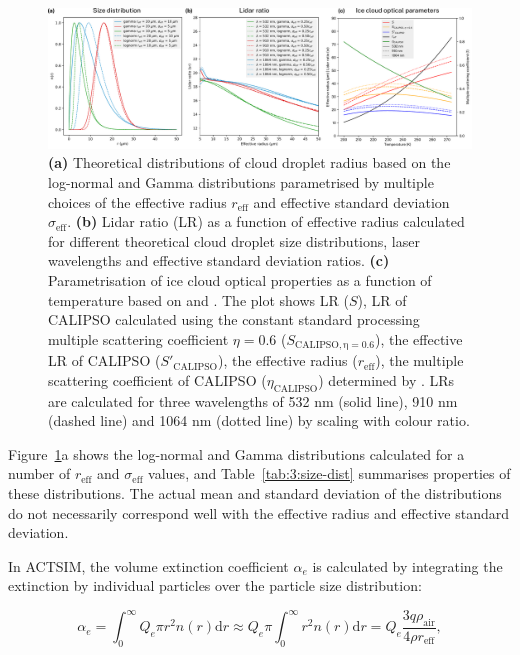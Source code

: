 \begin{figure}[t]
\centerline{\includegraphics[width=1.12\textwidth]{chapter3/fig/size_dist_rev2.pdf}}
\caption[Theoretical distributions of cloud droplet radius and parametrisation of ice]{
\textbf{(a)} Theoretical distributions of cloud droplet radius based on
the log-normal and Gamma distributions parametrised
by multiple choices of the effective radius $r_\text{eff}$ and effective standard deviation
$\sigma_\text{eff}$. \textbf{(b)} Lidar ratio (LR) as a function of effective
radius calculated for different theoretical cloud droplet size
distributions, laser wavelengths and effective standard deviation ratios.
\textbf{(c)}
Parametrisation of ice cloud optical properties as a function of temperature
based on \cite{garnier2015} and \cite{heymsfield2005}. The plot shows
LR ($S$), LR of CALIPSO calculated using the constant
standard processing
multiple scattering coefficient $\eta = 0.6$ ($S_\mathrm{CALIPSO,\eta=0.6}$),
the effective LR of CALIPSO ($S'_\mathrm{CALIPSO}$), the effective
radius ($r_\mathrm{eff}$), the multiple scattering coefficient of CALIPSO
($\eta_\mathrm{CALIPSO}$) determined by \cite{garnier2015}.
LRs are calculated for three wavelengths
of 532 nm (solid line), 910 nm (dashed line) and 1064 nm (dotted line) by
scaling with colour ratio.
}
\label{fig:3:size-dist}
\end{figure}

Figure~\ref{fig:3:size-dist}a shows the log-normal and Gamma distributions
calculated for a number of $r_\text{eff}$ and $\sigma_\text{eff}$ values,
and Table~\ref{tab:3:size-dist} summarises properties of these distributions.
The actual mean and standard deviation of the distributions do not necessarily
correspond well with the effective radius and effective standard deviation.

In ACTSIM, the volume extinction coefficient $\alpha_e$
is calculated by integrating the extinction by individual particles over the
particle size distribution:

\begin{equation}
\alpha_e =
\int_0^\infty Q_e\pi r^2 n(r) \mathrm{d}r \approx
Q_e\pi\int_0^\infty r^2 n(r) \mathrm{d}r =
Q_e \frac{3q\rho_\text{air}}{4\rho r_\text{eff}} ,
\end{equation}

